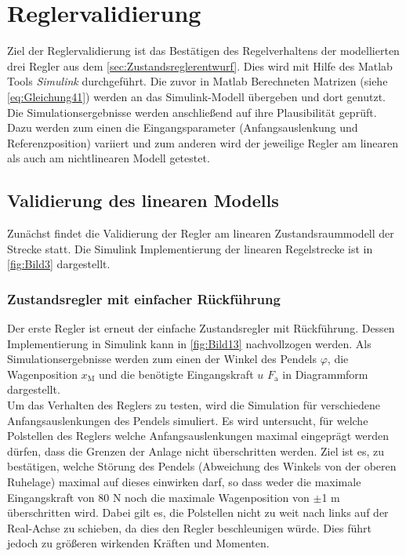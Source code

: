 \section{Reglervalidierung} \label{sec:reglervalidierung}

Ziel der Reglervalidierung ist das Bestätigen des Regelverhaltens der modellierten drei Regler aus dem \autoref{sec:Zustandsreglerentwurf}. Dies wird mit Hilfe des Matlab Tools \textit{Simulink} durchgeführt. Die zuvor in Matlab Berechneten Matrizen (siehe \zB \autoref{eq:Gleichung41}) werden an das Simulink-Modell übergeben und dort genutzt. Die Simulationsergebnisse werden anschließend auf ihre Plausibilität geprüft. Dazu werden zum einen die Eingangsparameter (Anfangsauslenkung und Referenzposition) variiert und zum anderen wird der jeweilige Regler am linearen als auch am nichtlinearen Modell getestet.

\subsection{Validierung des linearen Modells}

Zunächst findet die Validierung der Regler am linearen Zustandsraummodell der Strecke statt. Die Simulink Implementierung der linearen Regelstrecke ist in \autoref{fig:Bild3} dargestellt.

\subsubsection{Zustandsregler mit einfacher Rückführung} \label{sec:val-acker}

Der erste Regler ist erneut der einfache Zustandsregler mit Rückführung. Dessen Implementierung in Simulink kann in \autoref{fig:Bild13} nachvollzogen werden. Als Simulationsergebnisse werden zum einen der Winkel des Pendels $\varphi$, die Wagenposition $x_{\mathrm{M}}$ und die benötigte Eingangskraft $u$ \bzw $F_{\mathrm{a}}$ in Diagrammform dargestellt. \\
Um das Verhalten des Reglers zu testen, wird die Simulation für verschiedene Anfangsauslenkungen des Pendels simuliert. Es wird untersucht, für welche Polstellen des Reglers welche Anfangsauslenkungen maximal eingeprägt werden dürfen, dass die Grenzen der Anlage nicht überschritten werden. Ziel ist es, zu bestätigen, welche Störung des Pendels (Abweichung des Winkels von der oberen Ruhelage) maximal auf dieses einwirken darf, so dass weder die maximale Eingangskraft von 80 N noch die maximale Wagenposition von $\pm$1 m überschritten wird. Dabei gilt es, die Polstellen nicht zu weit nach links auf der Real-Achse zu schieben, da dies den Regler beschleunigen würde. Dies führt jedoch zu größeren wirkenden Kräften und Momenten.

